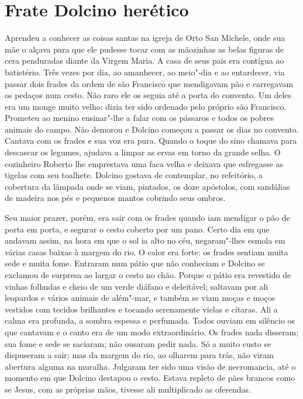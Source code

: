 \chapter{Frate Dolcino herético}

Aprendeu a conhecer as coisas santas na igreja de Orto San Michele, onde
sua mãe o alçava para que ele pudesse tocar com as mãozinhas as belas
figuras de cera penduradas diante da Virgem Maria. A casa de seus pais era
contígua ao batistério. Três vezes por dia, ao amanhecer, ao meio"-dia e ao
entardecer, via passar dois frades da ordem de são Francisco que
mendigavam pão e carregavam os pedaços num cesto. Não raro ele os seguia
até a porta do convento. Um deles era um monge muito velho: dizia ter sido
ordenado pelo próprio são Francisco. Prometeu ao menino ensinar"-lhe a
falar com os pássaros e todos os pobres animais do campo. Não demorou e
Dolcino começou a passar os dias no convento. Cantava com os frades e sua
voz era pura. Quando o toque do sino chamava para descascar os legumes,
ajudava a limpar as ervas em torno da grande selha. O cozinheiro Roberto
lhe emprestava uma faca velha e deixava que esfregasse as tigelas com seu
toalhete. Dolcino gostava de contemplar, no refeitório, a cobertura da
lâmpada onde se viam, pintados, os doze apóstolos, com sandálias de
madeira nos pés e pequenos mantos cobrindo seus ombros.

Seu maior prazer, porém, era sair com os frades quando iam mendigar o pão
de porta em porta, e segurar o cesto coberto por um pano. Certo dia em que
andavam assim, na hora em que o sol ia alto no céu, negaram"-lhes esmola em
várias casas baixas à margem do rio. O calor era forte: os frades sentiam
muita sede e muita fome. Entraram num pátio que não conheciam e Dolcino se
exclamou de surpresa ao largar o cesto no chão. Porque o pátio era
revestido de vinhas folhudas e cheio de um verde diáfano e deleitável;
saltavam por ali leopardos e vários animais de além"-mar, e também se viam
moças e moços vestidos com tecidos brilhantes e tocando serenamente vielas
e cítaras. Ali a calma era profunda, a sombra espessa e perfumada. Todos
ouviam em silêncio os que cantavam e o canto era de um modo
extraordinário. Os frades nada disseram; sua fome e sede se saciaram; não
ousaram pedir nada. Só a muito custo se dispuseram a sair; mas da margem
do rio, ao olharem para trás, não viram abertura alguma na muralha.
Julgaram ter sido uma visão de necromancia, até o momento em que Dolcino
destapou o cesto. Estava repleto de pães brancos como se Jesus, com as
próprias mãos, tivesse ali multiplicado as oferendas.

